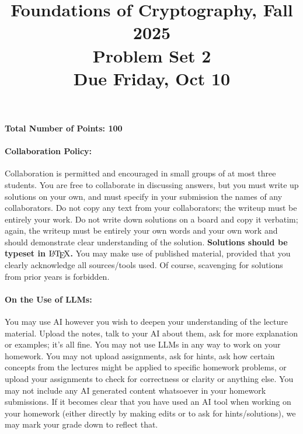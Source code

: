 \documentclass{article}
\title{Foundations of Cryptography, Fall 2025 \\ Problem Set 2 \\ Due Friday, Oct 10}
\date{}
\author{}
\begin{document}
\maketitle

\paragraph{Total Number of Points: 100}

\paragraph{Collaboration Policy:} Collaboration is permitted and encouraged in small groups of at most three students. You are free to collaborate in discussing answers, but you must write up solutions on your own, and must specify in your submission the names of any collaborators. Do not copy any text from your collaborators; the writeup must be entirely your work. Do not write down solutions on a board and copy it verbatim; again, the writeup must be entirely your own words and your own work and should demonstrate clear understanding of the solution. \textbf{Solutions should be typeset in $\text{\LaTeX}$.} You may make use of published material, provided that you clearly acknowledge all sources/tools used. Of course, scavenging for solutions from prior years is forbidden.

\paragraph{On the Use of LLMs:} You may use AI however you wish to deepen your understanding of the lecture material. Upload the notes, talk to your AI about them, ask for more explanation or examples; it's all fine. You may not use LLMs in any way to work on your homework. You may not upload assignments, ask for hints, ask how certain concepts from the lectures might be applied to specific homework problems, or upload your assignments to check for correctness or clarity or anything else. You may not include any AI generated content whatsoever in your homework submissions. If it becomes clear that you have used an AI tool when working on your homework (either directly by making edits or to ask for hints/solutions), we may mark your grade down to reflect that.
\end{document}
